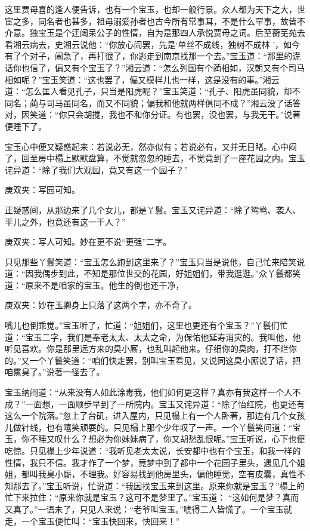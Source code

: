\begin{parag}
    这里贾母喜的逢人便告诉，也有一个宝玉，也却一般行景。众人都为天下之大，世宦之多，同名者也甚多，祖母溺爱孙者也古今所有常事耳，不是什么罕事，故皆不介意。独宝玉是个迂阔呆公子的性情，自为是那四人承悦贾母之词。后至蘅芜苑去看湘云病去，史湘云说他：“你放心闹罢，先是‘单丝不成线，独树不成林 ’，如今有了个对子，闹急了，再打很了，你逃走到南京找那一个去。”宝玉道：“那里的谎话你也信了，偏又有个宝玉了？”湘云道：“怎么列国有个蔺相如，汉朝又有个司马相如呢？”宝玉笑道：“这也罢了，偏又模样儿也一样，这是没有的事。”湘云道：“怎么匡人看见孔子，只当是阳虎呢？”宝玉笑道：“孔子、阳虎虽同貌，却不同名；蔺与司马虽同名，而又不同貌；偏我和他就两样俱同不成？”湘云没了话答对，因笑道：“你只会胡搅，我也不和你分证。有也罢，没也罢，与我无干。”说著便睡下了。
\end{parag}


\begin{parag}
    宝玉心中便又疑惑起来：若说必无，然亦似有；若说必有，又并无目睹。心中闷了，回至房中榻上默默盘算，不觉就忽忽的睡去，不觉竟到了一座花园之内。宝玉诧异道：“除了我们大观园，竟又有这一个园子？”\begin{note}庚双夹：写园可知。\end{note}正疑惑间，从那边来了几个女儿，都是丫鬟。宝玉又诧异道：“除了鸳鸯、袭人、平儿之外，也竟还有这一干人？”\begin{note}庚双夹：写人可知。妙在更不说“更强”二字。\end{note}只见那些丫鬟笑道：“宝玉怎么跑到这里来了？”宝玉只当是说他，自己忙来陪笑说道：“因我偶步到此，不知是那位世交的花园，好姐姐们，带我逛逛。”众丫鬟都笑道：“原来不是咱家的宝玉。他生的倒也还干净，\begin{note}庚双夹：妙在玉卿身上只落了这两个字，亦不奇了。\end{note}嘴儿也倒乖觉。”宝玉听了，忙道：“姐姐们，这里也更还有个宝玉？”丫鬟们忙道：“宝玉二字，我们是奉老太太、太太之命，为保佑他延寿消灾的。我叫他，他听见喜欢。你是那里远方来的臭小厮，也乱叫起他来。仔细你的臭肉，打不烂你的。”又一个丫鬟笑道：“咱们快走罢，别叫宝玉看见，又说同这臭小厮说了话，把咱熏臭了。”说著一径去了。
\end{parag}


\begin{parag}
    宝玉纳闷道：“从来没有人如此涂毒我，他们如何更这样？真亦有我这样一个人不成？”一面想，一面顺步早到了一所院内。宝玉又诧异道：“除了怡红院，也更还有这么一个院落。”忽上了台矶，进入屋内，只见榻上有一个人卧著，那边有几个女孩儿做针线，也有嘻笑顽耍的。只见榻上那个少年叹了一声。一个丫鬟笑问道：“宝玉，你不睡又叹什么？想必为你妹妹病了，你又胡愁乱恨呢。”宝玉听说，心下也便吃惊。只见榻上少年说道：“我听见老太太说，长安都中也有个宝玉，和我一样的性情，我只不信。我才作了一个梦，竟梦中到了都中一个花园子里头，遇见几个姐姐，都叫我臭小厮，不理我。好容易找到他房里头，偏他睡觉，空有皮囊，真性不知那去了。”宝玉听说，忙说道：“我因找宝玉来到这里。原来你就是宝玉？”榻上的忙下来拉住：“原来你就是宝玉？这可不是梦里了。”宝玉道： “这如何是梦？真而又真了。”一语未了，只见人来说：“老爷叫宝玉。”唬得二人皆慌了。一个宝玉就走，一个宝玉便忙叫：“宝玉快回来，快回来！”
\end{parag}


